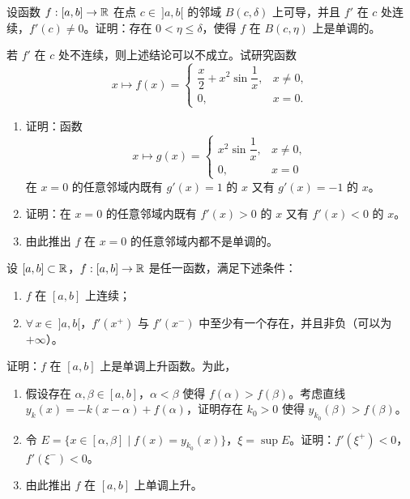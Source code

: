 \begin{exercise}
	\item 设函数 \(f:[a,b]\to\mathbb{R}\) 在点 \(c\in\ ]a,b[\) 的邻域 \(B(c,\delta)\) 上可导，并且 \(f'\) 在 \(c\) 处连续，\(f'(c)\neq0\)。证明：存在 \(0<\eta\le\delta\)，使得 \(f\) 在 \(B(c,\eta)\) 上是单调的。

	若 \(f'\) 在 \(c\) 处不连续，则上述结论可以不成立。试研究函数
	\[
	x\longmapsto f(x)=\begin{cases} \dfrac x2+x^2\sin\dfrac1x, & x\neq0, \\[6pt] 0, & x=0. \end{cases}
	\]
	\begin{enumerate}[label=\arabic*)]
		\item 证明：函数
		\[
		x\longmapsto g(x)=\begin{cases} x^2\sin\dfrac1x, & x\neq0, \\[6pt] 0, & x=0 \end{cases}
		\]
		在 \(x=0\) 的任意邻域内既有 \(g'(x)=1\) 的 \(x\) 又有 \(g'(x)=-1\) 的 \(x\)。
		\item 证明：在 \(x=0\) 的任意邻域内既有 \(f'(x)>0\) 的 \(x\) 又有 \(f'(x)<0\) 的 \(x\)。
		\item 由此推出 \(f\) 在 \(x=0\) 的任意邻域内都不是单调的。
	\end{enumerate}
\end{exercise}

\begin{exercise}
	\item 设 \([a,b]\subset\mathbb{R}\)，\(f:[a,b]\to\mathbb{R}\) 是任一函数，满足下述条件：
	\begin{enumerate}[label=\arabic*)]
		\item \(f\) 在 \([a,b]\) 上连续；
		\item \(\forall\,x\in\ ]a,b[\)，\(f'(x^+)\) 与 \(f'(x^-)\) 中至少有一个存在，并且非负（可以为 \(+\infty\)）。
	\end{enumerate}
	证明：\(f\) 在 \([a,b]\) 上是单调上升函数。为此，
	\begin{enumerate}[label=\arabic*)]
		\item 假设存在 \(\alpha,\beta\in[a,b]\)，\(\alpha<\beta\) 使得 \(f(\alpha)>f(\beta)\)。考虑直线 \(y_k(x)=-k(x-\alpha)+f(\alpha)\)，证明存在 \(k_0>0\) 使得 \(y_{k_0}(\beta)>f(\beta)\)。
		\item 令 \(E=\{x\in[\alpha,\beta]\mid f(x)=y_{k_0}(x)\}\)，\(\xi=\sup E\)。证明：\(f'(\xi^+)<0\)，\(f'(\xi^-)<0\)。
		\item 由此推出 \(f\) 在 \([a,b]\) 上单调上升。
	\end{enumerate}
\end{exercise}


